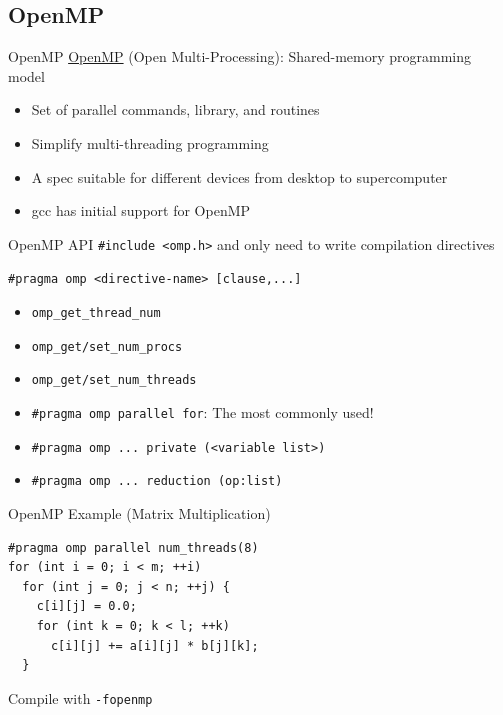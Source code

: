 \documentclass{../TexTemplate/myslide}
\begin{document}
\subsection{OpenMP}
\begin{frame}
\subsectionpage
\end{frame}

\begin{frame}{OpenMP}
\href{https://www.openmp.org/}{OpenMP} (Open Multi-Processing): Shared-memory programming model
\begin{itemize}
	\item Set of parallel commands, library, and routines
	\item Simplify multi-threading programming
	\item A spec suitable for different devices from desktop to supercomputer
	\item gcc has initial support for OpenMP
\end{itemize}
\end{frame}

\begin{frame}[fragile]{OpenMP API}
\verb'#include <omp.h>' and only need to write compilation directives
\begin{center}
\verb'#pragma omp <directive-name> [clause,...]'
\end{center}
\begin{itemize}
	\item \verb'omp_get_thread_num'
	\item \verb'omp_get/set_num_procs'
	\item \verb'omp_get/set_num_threads'
	\item \verb'#pragma omp parallel for': The most commonly used!
	\item \verb'#pragma omp ... private (<variable list>)'
	\item \verb'#pragma omp ... reduction (op:list)'
\end{itemize}
\end{frame}

\begin{frame}[fragile]{OpenMP Example (Matrix Multiplication)}
\begin{lstlisting}
#pragma omp parallel num_threads(8)
for (int i = 0; i < m; ++i)
  for (int j = 0; j < n; ++j) {
    c[i][j] = 0.0;
    for (int k = 0; k < l; ++k)
      c[i][j] += a[i][j] * b[j][k];
  }
\end{lstlisting}
Compile with \verb'-fopenmp'
\end{frame}
\end{document}

